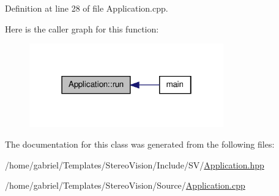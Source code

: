 Definition at line 28 of file Application.\-cpp.



Here is the caller graph for this function\-:
\nopagebreak
\begin{figure}[H]
\begin{center}
\leavevmode
\includegraphics[width=238pt]{class_application_a68965449404743bf1add056784d6cf81_icgraph}
\end{center}
\end{figure}




The documentation for this class was generated from the following files\-:\begin{DoxyCompactItemize}
\item 
/home/gabriel/\-Templates/\-Stereo\-Vision/\-Include/\-S\-V/\hyperlink{_application_8hpp}{Application.\-hpp}\item 
/home/gabriel/\-Templates/\-Stereo\-Vision/\-Source/\hyperlink{_application_8cpp}{Application.\-cpp}\end{DoxyCompactItemize}

